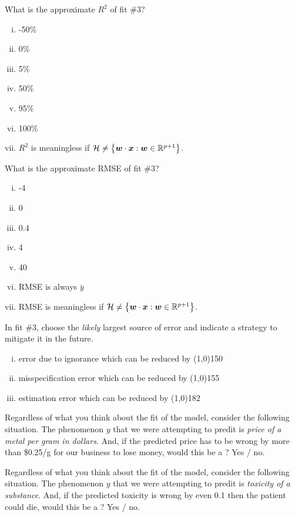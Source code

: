 \documentclass[12pt]{article}
\begin{document}
 What is the approximate $R^2$ of fit \#3?

\begin{enumerate}[i)]
\item -50\%
\item 0\%
\item 5\%
\item 50\%
\item 95\%
\item 100\%
\item $R^2$ is meaningless if $\mathcal{H} \neq \left\{\boldsymbol{w} \cdot \boldsymbol{x} : \boldsymbol{w} \in \mathbb{R}^{p + 1}\right\}$.
\end{enumerate}

 What is the approximate RMSE of fit \#3?

\begin{enumerate}[i)]
\item -4
\item 0
\item 0.4
\item 4
\item 40
\item RMSE is always $\bar{y}$
\item RMSE is meaningless if $\mathcal{H} \neq \left\{\boldsymbol{w} \cdot \boldsymbol{x} : \boldsymbol{w} \in \mathbb{R}^{p + 1}\right\}$.
\end{enumerate}

  In fit \#3, choose the \emph{likely} largest source of error and indicate a strategy to mitigate it in the future.

\begin{enumerate}[i)]
\item error due to ignorance which can be reduced by \line(1,0){150}
\item misspecification error which can be reduced by \line(1,0){155}
\item estimation error which can be reduced by \line(1,0){182}
\end{enumerate}

  Regardless of what you think about the fit of the model, consider the following situation. The phenomenon $y$ that we were attempting to predit is \emph{price of a metal per gram in dollars}. And, if the predicted price has to be wrong by more than \$0.25/g for our business to lose money, would this be a ? Yes / no.

  Regardless of what you think about the fit of the model, consider the following situation. The phenomenon $y$ that we were attempting to predit is \emph{toxicity of a substance}. And, if the predicted toxicity is wrong by even 0.1 then the patient could die, would this be a ? Yes / no.
\end{document}

